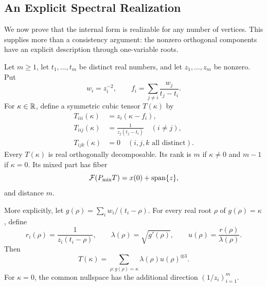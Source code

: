 \subsection{An Explicit Spectral Realization}
We now prove that the internal form is realizable for any number of vertices. This supplies more than a consistency argument: the nonzero orthogonal components have an explicit description through one-variable roots.

\begin{theorem}\label{thm:spectral}
Let $m\ge1$, let $t_1,\ldots,t_m$ be distinct real numbers, and let $z_1,\ldots,z_m$ be nonzero. Put
\begin{equation}\label{eq:cauchy-defs}
 w_i=z_i^{-2},\qquad
 f_i=\sum_{j\ne i}\frac{w_j}{t_j-t_i}.
\end{equation}
For $\kappa\in\mathbb R$, define a symmetric cubic tensor $T(\kappa)$ by
\begin{align}
 T_{iii}(\kappa)&=z_i(\kappa-f_i),\label{eq:cauchy-diagonal}\\
 T_{iij}(\kappa)&=\frac{1}{z_j(t_j-t_i)}\quad(i\ne j),\label{eq:cauchy-pairs}\\
 T_{ijk}(\kappa)&=0\quad(i,j,k\text{ all distinct}).\nonumber
\end{align}
Every $T(\kappa)$ is real orthogonally decomposable. Its rank is $m$ if $\kappa\ne0$ and $m-1$ if $\kappa=0$. Its mixed part has fiber
\begin{equation}\label{eq:cauchy-fiber}
 \mathcal F(P_{\rm mix}T)=x(0)+\operatorname{span}\{z\},
\end{equation}
and distance $m$.

More explicitly, let $g(\rho)=\sum_i w_i/(t_i-\rho)$. For every real root $\rho$ of $g(\rho)=\kappa$, define
\begin{equation}\label{eq:cauchy-eigen}
 r_i(\rho)=\frac{1}{z_i(t_i-\rho)},\qquad
 \lambda(\rho)=\sqrt{g'(\rho)},\qquad
 u(\rho)=\frac{r(\rho)}{\lambda(\rho)}.
\end{equation}
Then
\begin{equation}\label{eq:cauchy-decomposition}
 T(\kappa)=\sum_{\rho:g(\rho)=\kappa}\lambda(\rho)u(\rho)^{\otimes3}.
\end{equation}
For $\kappa=0$, the common nullspace has the additional direction $(1/z_i)_{i=1}^m$.
\end{theorem}
